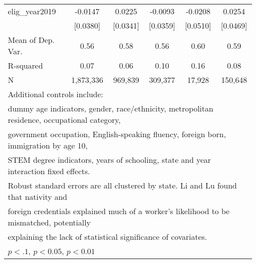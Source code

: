 \begin{table}[htbp]
\begin{tabular}{l*{5}{c}}
\addlinespace
elig\_year2019       &     -0.0147         &      0.0225         &     -0.0093         &     -0.0208         &      0.0254         \\
                    &    [0.0380]         &    [0.0341]         &    [0.0359]         &    [0.0510]         &    [0.0469]         \\
\midrule
Mean of Dep. Var.   &        0.56         &        0.58         &        0.56         &        0.60         &        0.59         \\
R-squared           &        0.07         &        0.06         &        0.10         &        0.16         &        0.08         \\
N                   &   1,873,336         &     969,839         &     309,377         &      17,928         &     150,648         \\
\bottomrule
\multicolumn{6}{l}{\footnotesize Additional controls include:}\\
\multicolumn{6}{l}{\footnotesize dummy age indicators, gender, race/ethnicity, metropolitan residence, occupational category,}\\
\multicolumn{6}{l}{\footnotesize government occupation, English-speaking fluency, foreign born, immigration by age 10,}\\
\multicolumn{6}{l}{\footnotesize STEM degree indicators, years of schooling, state and year interaction fixed effects.}\\
\multicolumn{6}{l}{\footnotesize Robust standard errors are all clustered by state. Li and Lu found that nativity and}\\
\multicolumn{6}{l}{\footnotesize foreign credentials explained much of a worker's likelihood to be mismatched, potentially}\\
\multicolumn{6}{l}{\footnotesize explaining the lack of statistical significance of covariates.}\\
\multicolumn{6}{l}{\footnotesize \sym{*} \(p<.1\), \sym{**} \(p<0.05\), \sym{***} \(p<0.01\)}\\
\end{tabular}
\end{table}
